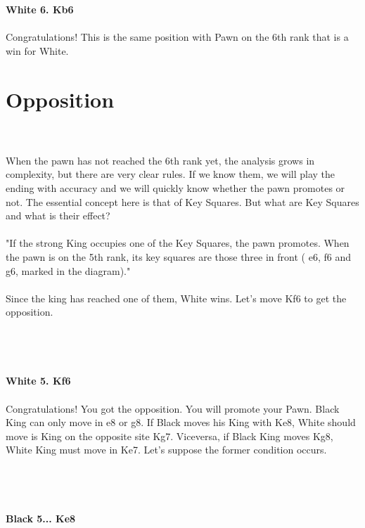 \documentclass{article}
\begin{document}

\\
\\
\textbf{White 6. Kb6}\\
\\
Congratulations! This is the same position with Pawn on the 6th rank that is a win for White.\section{ Opposition}

\\
\\
When the pawn has not reached the 6th rank yet, the analysis grows in complexity, but there are very clear rules. If we know them, we will play the ending with accuracy and we will quickly know whether the pawn promotes or not. The essential concept here is that of Key Squares. But what are Key Squares and what is their effect?\\\\"If the strong King occupies one of the Key Squares, the pawn promotes. When the pawn is on the 5th rank, its key squares are those three in front ( e6, f6 and g6, marked in the diagram)."\\\\Since the king has reached one of them, White wins. Let's move Kf6 to get the opposition.\\\\
\\

\\
\\
\textbf{White 5. Kf6}\\
\\
Congratulations! You got the opposition. You will promote your Pawn. Black King can only move in e8 or g8. If Black moves his King with Ke8, White should move is King on the opposite site Kg7. Viceversa, if Black King moves Kg8, White King must move in Ke7. Let's suppose the former condition occurs.\\\\
\\

\\
\\
\textbf{Black 5... Ke8}\\
\\
\end{document}
